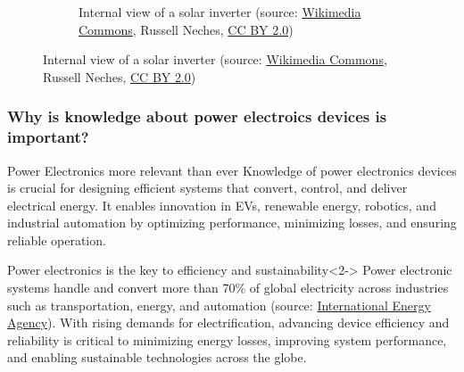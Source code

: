 \begin{frame}
\begin{figure}
\begin{subfigure}[t]{0.4\textwidth}
			\caption{Internal view of a solar inverter (source: \href{https://commons.wikimedia.org/wiki/File:Sunny_Boy_3000.jpg}{Wikimedia Commons}, Russell Neches, \href{https://creativecommons.org/licenses/by/2.0/}{CC BY 2.0})}
		\end{subfigure}
	\end{figure}
\end{frame}

\begin{frame}
	\frametitle{Why is knowledge about power electroics devices is important?}
	\begin{varblock}{Power Electronics more relevant than ever}
		Knowledge of power electronics devices is crucial for designing efficient systems that convert, control, and deliver electrical energy. It enables innovation in EVs, renewable energy, robotics, and industrial automation by optimizing performance, minimizing losses, and ensuring reliable operation. 
	\end{varblock}
	\begin{varblock}{Power electronics is the key to efficiency and sustainability}<2->
		Power electronic systems handle and convert more than 70\% of global electricity across industries such as transportation, energy, and automation (source: \href{https://www.hitachienergy.com/news-and-events/perspectives/2021/08/power-electronics-revolutionizing-the-world-s-future-energy-systems}{International Energy Agency}). With rising demands for electrification, advancing device efficiency and reliability is critical to minimizing energy losses, improving system performance, and enabling sustainable technologies across the globe.
	\end{varblock}
\end{frame}

